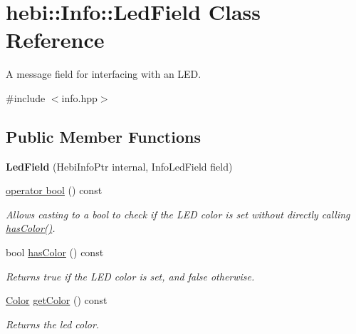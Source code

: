 \hypertarget{classhebi_1_1Info_1_1LedField}{}\section{hebi\+:\+:Info\+:\+:Led\+Field Class Reference}
\label{classhebi_1_1Info_1_1LedField}


A message field for interfacing with an L\+ED.  




{\ttfamily \#include $<$info.\+hpp$>$}

\subsection*{Public Member Functions}
\begin{DoxyCompactItemize}
\item 
{\bfseries Led\+Field} (Hebi\+Info\+Ptr internal, Info\+Led\+Field field)\hypertarget{classhebi_1_1Info_1_1LedField_af012c0a7e7b4cbe1d41ad8a19441a157}{}\label{classhebi_1_1Info_1_1LedField_af012c0a7e7b4cbe1d41ad8a19441a157}

\item 
\hyperlink{classhebi_1_1Info_1_1LedField_a61363ddb97509b63af4a1fdca0dfbbd9}{operator bool} () const 
\begin{DoxyCompactList}\small\item\em Allows casting to a bool to check if the L\+ED color is set without directly calling {\ttfamily \hyperlink{classhebi_1_1Info_1_1LedField_a74357482507d6992496df77a27409763}{has\+Color()}}. \end{DoxyCompactList}\item 
bool \hyperlink{classhebi_1_1Info_1_1LedField_a74357482507d6992496df77a27409763}{has\+Color} () const \hypertarget{classhebi_1_1Info_1_1LedField_a74357482507d6992496df77a27409763}{}\label{classhebi_1_1Info_1_1LedField_a74357482507d6992496df77a27409763}

\begin{DoxyCompactList}\small\item\em Returns true if the L\+ED color is set, and false otherwise. \end{DoxyCompactList}\item 
\hyperlink{structhebi_1_1Color}{Color} \hyperlink{classhebi_1_1Info_1_1LedField_a1ee02308d8b3667e1c12faab25c9673e}{get\+Color} () const \hypertarget{classhebi_1_1Info_1_1LedField_a1ee02308d8b3667e1c12faab25c9673e}{}\label{classhebi_1_1Info_1_1LedField_a1ee02308d8b3667e1c12faab25c9673e}

\begin{DoxyCompactList}\small\item\em Returns the led color. \end{DoxyCompactList}\end{DoxyCompactItemize}


